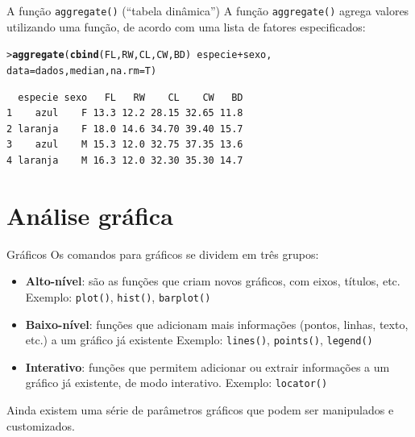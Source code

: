 \documentclass[10pt]{beamer}\usepackage[]{graphicx}\usepackage[]{color}
\makeatletter
\newcommand{\hlopt}[1]{\textcolor[rgb]{0,0,0}{#1}}%
\newcommand{\hlstd}[1]{\textcolor[rgb]{0.345,0.345,0.345}{#1}}%
\newcommand{\hlkwc}[1]{\textcolor[rgb]{0.333,0.667,0.333}{#1}}%
\newcommand{\hlkwd}[1]{\textcolor[rgb]{0.282,0.239,0.545}{\textbf{#1}}}%
\newenvironment{kframe}{%
 \def\at@end@of@kframe{}%
 \ifinner\ifhmode%
  \def\at@end@of@kframe{\end{minipage}}%
  \begin{minipage}{\columnwidth}%
 \fi\fi%
 \def\FrameCommand##1{\hskip\@totalleftmargin \hskip-\fboxsep
 \colorbox{shadecolor}{##1}\hskip-\fboxsep
     \hskip-\linewidth \hskip-\@totalleftmargin \hskip\columnwidth}%
 \MakeFramed {\advance\hsize-\width
   \@totalleftmargin\z@ \linewidth\hsize
   \@setminipage}}%
 {\par\unskip\endMakeFramed%
 \at@end@of@kframe}
\newenvironment{knitrout}{}{} %
\makeatother
\begin{document}
\begin{frame}[fragile=singleslide]{A função \texttt{aggregate()} (``tabela dinâmica'')}
A função \texttt{aggregate()} agrega valores utilizando uma função, de
acordo com uma lista de fatores especificados:
\begin{knitrout}\small
{}\color{fgcolor}\begin{kframe}
\begin{alltt}
\hlstd{> }\hlkwd{aggregate}\hlstd{(}\hlkwd{cbind}\hlstd{(FL, RW, CL, CW, BD)} \hlopt{~} \hlstd{especie} \hlopt{+} \hlstd{sexo,}
\hlstd{  }          \hlkwc{data} \hlstd{= dados, median,} \hlkwc{na.rm}\hlstd{=T)}
\end{alltt}
\begin{verbatim}
  especie sexo   FL   RW    CL    CW   BD
1    azul    F 13.3 12.2 28.15 32.65 11.8
2 laranja    F 18.0 14.6 34.70 39.40 15.7
3    azul    M 15.3 12.0 32.75 37.35 13.6
4 laranja    M 16.3 12.0 32.30 35.30 14.7
\end{verbatim}
\end{kframe}
\end{knitrout}

\end{frame}

\section{Análise gráfica}

\begin{frame}[fragile=singleslide]{Gráficos}
Os comandos para gráficos se dividem em três grupos:
\begin{itemize}
\item \textbf{Alto-nível}: são as funções que criam novos gráficos, com
  eixos, títulos, etc. Exemplo: \texttt{plot()}, \texttt{hist()},
  \texttt{barplot()}
\item \textbf{Baixo-nível}: funções que adicionam mais informações
  (pontos, linhas, texto, etc.) a um gráfico já existente Exemplo:
  \texttt{lines()}, \texttt{points()}, \texttt{legend()}
\item \textbf{Interativo}: funções que permitem adicionar ou extrair
  informações a um gráfico já existente, de modo interativo. Exemplo:
  \texttt{locator()}
\end{itemize}
Ainda existem uma série de parâmetros gráficos que podem ser manipulados
e customizados.
\end{frame}
\end{document}
